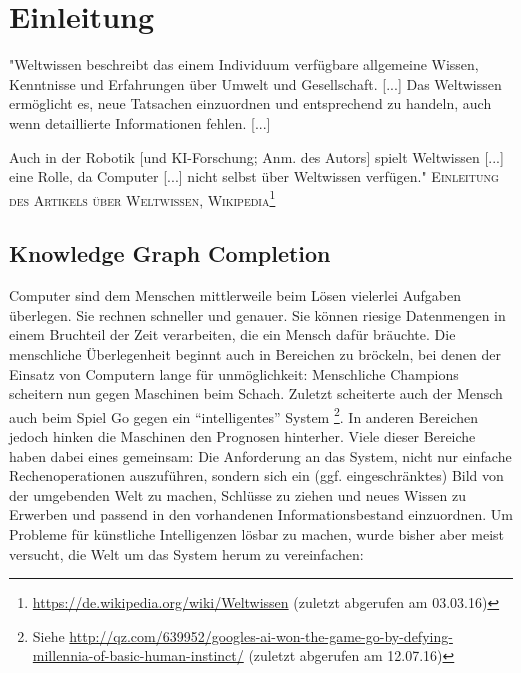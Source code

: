 
\chapter{Einleitung} %

\label{Chapter1} %


\newcommand{\keyword}[1]{\textbf{#1}}
\newcommand{\tabhead}[1]{\textbf{#1}}
\newcommand{\code}[1]{\texttt{#1}}
\newcommand{\file}[1]{\texttt{\bfseries#1}}
\newcommand{\option}[1]{\texttt{\itshape#1}}


\begin{itquote}
"Weltwissen beschreibt das einem Individuum verfügbare allgemeine Wissen, Kenntnisse und Erfahrungen über Umwelt und Gesellschaft. [...]
Das Weltwissen ermöglicht es, neue Tatsachen einzuordnen und entsprechend zu handeln, auch wenn detaillierte Informationen fehlen. [...]

Auch in der Robotik [und KI-Forschung; Anm. des Autors] spielt Weltwissen [...] eine Rolle,
da Computer [...] nicht selbst über Weltwissen verfügen."
\flushright
\textsc{Einleitung des Artikels über Weltwissen, Wikipedia\footnote{\url{https://de.wikipedia.org/wiki/Weltwissen} (zuletzt abgerufen am 03.03.16)}}
\end{itquote}

\section{Knowledge Graph Completion}

Computer sind dem Menschen mittlerweile beim Lösen vielerlei Aufgaben überlegen. Sie rechnen schneller und genauer.
Sie können riesige Datenmengen in einem Bruchteil der Zeit verarbeiten, die ein Mensch dafür bräuchte. Die menschliche
Überlegenheit beginnt auch in Bereichen zu bröckeln, bei denen der Einsatz von Computern lange für unmöglichkeit: Menschliche
Champions scheitern nun gegen Maschinen beim Schach. Zuletzt scheiterte auch der Mensch auch beim Spiel Go gegen ein ``intelligentes'' System
\footnote{Siehe \url{http://qz.com/639952/googles-ai-won-the-game-go-by-defying-millennia-of-basic-human-instinct/} (zuletzt abgerufen am 12.07.16)}.
In anderen Bereichen jedoch hinken die Maschinen den Prognosen hinterher. Viele dieser Bereiche haben dabei eines gemeinsam:
Die Anforderung an das System, nicht nur einfache Rechenoperationen auszuführen, sondern sich ein (ggf. eingeschränktes) Bild von der umgebenden Welt zu machen,
Schlüsse zu ziehen und neues Wissen zu Erwerben und passend in den vorhandenen Informationsbestand einzuordnen. Um Probleme
für künstliche Intelligenzen lösbar zu machen, wurde bisher aber meist versucht, die Welt um das System herum zu vereinfachen:\\

